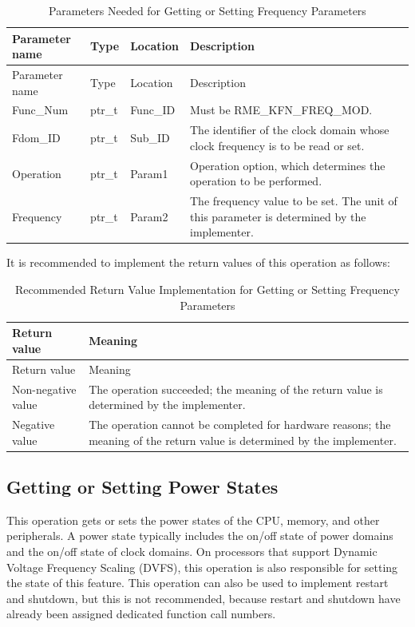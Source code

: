 \begin{xltabular}{\textwidth}{@{}>{\hsize\raggedright\arraybackslash}X>{\hsize\raggedright\arraybackslash}X>{\hsize\raggedright\arraybackslash}X>{\hsize\raggedright\arraybackslash}X@{}}
\caption{Parameters Needed for Getting or Setting Frequency Parameters}\label{tab:8-51-get-or-set-frequency-parameters}\\
\toprule
Parameter name & Type & Location & Description\tabularnewline
\endfirsthead
\toprule
Parameter name & Type & Location & Description\tabularnewline
\midrule
\endhead
\bottomrule
\endlastfoot
Func\_Num & ptr\_t & Func\_ID & Must be RME\_KFN\_FREQ\_MOD.\tabularnewline
Fdom\_ID & ptr\_t & Sub\_ID &
The identifier of the clock domain whose clock frequency is to be read or set.\tabularnewline
Operation & ptr\_t & Param1 &
Operation option, which determines the operation to be performed.\tabularnewline
Frequency & ptr\_t & Param2 &
The frequency value to be set. The unit of this parameter is determined by the implementer.\tabularnewline
\end{xltabular}
\nopagebreak[4]

It is recommended to implement the return values of this operation as follows:

\begin{xltabular}{\textwidth}{@{}>{\hsize\raggedright\arraybackslash}X>{\hsize\raggedright\arraybackslash}X@{}}
\caption{Recommended Return Value Implementation for Getting or Setting Frequency Parameters}\label{tab:8-52-get-or-set-frequency-suggested-return-values}\\
\toprule
Return value & Meaning\tabularnewline
\endfirsthead
\toprule
Return value & Meaning\tabularnewline
\midrule
\endhead
\bottomrule
\endlastfoot
    Non-negative value & The operation succeeded; the meaning of the return value is determined by the implementer.\tabularnewline
    Negative value & The operation cannot be completed for hardware reasons; the meaning of the return value is determined by the implementer.\tabularnewline
\end{xltabular}
\nopagebreak[4]

\subsection{Getting or Setting Power States}\label{subsec:8-get-or-set-power-state}

This operation gets or sets the power states of the CPU, memory, and other peripherals. A power state typically includes the on/off state of power domains and the on/off state of clock domains. On processors that support Dynamic
Voltage Frequency
Scaling (DVFS), this operation is also responsible for setting the state of this feature. This operation can also be used to implement restart and shutdown, but this is not recommended, because restart and shutdown have already been assigned dedicated function call numbers.

